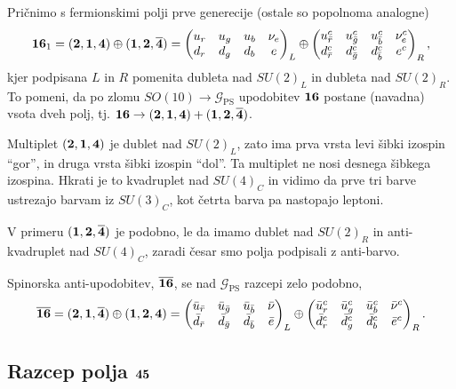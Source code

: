 Pričnimo s fermionskimi polji prve generecije (ostale so popolnoma analogne)
\begin{align}
	\mathbf{16}_1 = (\mathbf{2}, \mathbf{1}, \mathbf{4}) \oplus (\mathbf{1}, \mathbf{2}, \overline{\mathbf{4}}) =
	\begin{pmatrix}
		u_r & u_g & u_b & \nu_e \\
		d_r & d_g & d_b & e
	\end{pmatrix}_L \oplus \begin{pmatrix}
		u^c_{\bar{r}} & u^c_{\bar{g}} & u^c_{\bar{b}} & \nu^c_e \\
		d^c_{\bar{r}} & d^c_{\bar{g}} & d^c_{\bar{b}} & e^c
	\end{pmatrix}_R,
	\label{spinorial}
\end{align}
kjer podpisana $L$ in $R$ pomenita dubleta nad $SU(2)_L$ in dubleta nad $SU(2)_R$. To pomeni, da
po zlomu $SO(10) \to \mathcal{G}_\text{PS}$ upodobitev $\mathbf{16}$ postane (navadna) vsota dveh
polj, tj. $\mathbf{16} \to (\mathbf{2}, \mathbf{1}, \mathbf{4}) + (\mathbf{1}, \mathbf{2}, \overline{\mathbf{4}})$.

Multiplet $(\mathbf{2}, \mathbf{1}, \mathbf{4})$ je dublet nad $SU(2)_L$, zato ima prva vrsta levi šibki izospin "`gor"', in
druga vrsta šibki izospin "`dol"'. Ta multiplet ne nosi desnega šibkega izospina. Hkrati je to
kvadruplet nad $SU(4)_C$ in vidimo da prve tri barve ustrezajo barvam iz $SU(3)_C$, kot četrta
barva pa nastopajo leptoni.

V primeru $(\mathbf{1}, \mathbf{2}, \overline{\mathbf{4}})$ je podobno, le da imamo dublet nad $SU(2)_R$ in anti-kvadruplet nad
$SU(4)_C$, zaradi česar smo polja podpisali z anti-barvo.

Spinorska anti-upodobitev, $\overline{\mathbf{16}}$, se nad $\mathcal{G}_\text{PS}$ razcepi zelo podobno,
\begin{equation}
	\overline{\mathbf{16}} = (\mathbf{2}, \mathbf{1}, \overline{\mathbf{4}}) \oplus (\mathbf{1}, \mathbf{2}, \mathbf{4}) = \begin{pmatrix}
		\bar{u}_{\bar{r}} & \bar{u}_{\bar{g}} & \bar{u}_{\bar{b}} & \bar{\nu} \\
		\bar{d}_{\bar{r}} & \bar{d}_{\bar{g}} & \bar{d}_{\bar{b}} & \bar{e}
	\end{pmatrix}_L \oplus \begin{pmatrix}
		\bar{u}_{r}^c & \bar{u}_{g}^c & \bar{u}_{b}^c & \bar{\nu}^c \\
		\bar{d}_{r}^c & \bar{d}_{g}^c & \bar{d}_{b}^c & \bar{e}^c
	\end{pmatrix}_R.
\end{equation}

\subsection{Razcep polja $\mathbf{45}$}

